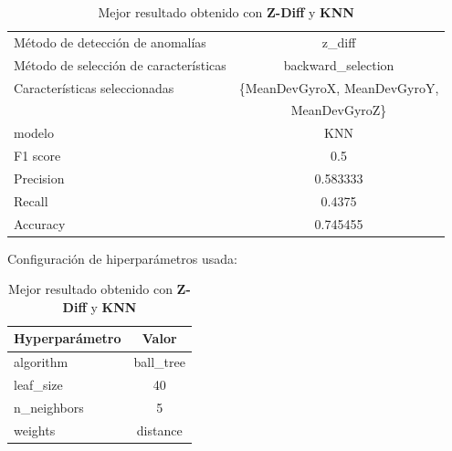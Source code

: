 \begin{appendices}
		\begin{table}[htb]
			\centering
			\caption{Mejor resultado obtenido con \textbf{Z-Diff} y \textbf{KNN}}
			\label{table:18}
			\begin{tabular}{lc}
				\toprule
				\midrule
					  Método de detección de anomalías &                                     z\_diff \\
				Método de selección de características &                         backward\_selection \\
						 Características seleccionadas & \{MeanDevGyroX, MeanDevGyroY, \\
						 							   & 							MeanDevGyroZ\}   \\
												modelo &                                        KNN \\
											  F1 score &                                        0.5 \\
											 Precision &                                   0.583333 \\
												Recall &                                     0.4375 \\
											  Accuracy &                                   0.745455 \\
				\bottomrule
				\end{tabular}
			\newline
			\newline
			Configuración de hiperparámetros usada:
			\begin{tabular}{lc}
				\toprule
				Hyperparámetro &     Valor \\
				\midrule
					 algorithm & ball\_tree \\
					 leaf\_size &        40 \\
				   n\_neighbors &         5 \\
					   weights &  distance \\
				\bottomrule
			\end{tabular}
			
		\end{table}


\end{appendices}
